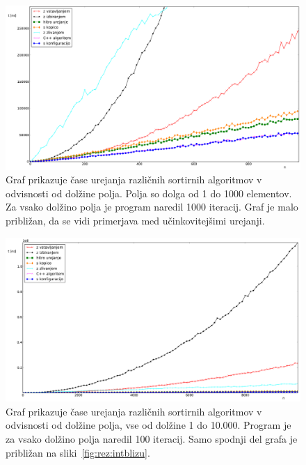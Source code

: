 \documentclass[a4paper,oneside,12pt]{article}
\begin{document}
\begin{figure}[h!]
    \includegraphics[width=\textwidth]{slike/int1000.pdf}
    \vspace{-0.7cm}
    \caption[Rezultati za tip \emph{int}, 1000 el.]{Graf prikazuje čase
    urejanja različnih sortirnih algoritmov v odvisnosti od dolžine polja. Polja
    so dolga od 1 do 1000 elementov. Za vsako dolžino polja je program naredil
    1000 iteracij. Graf je malo približan, da se vidi
    primerjava med učinkovitejšimi urejanji.}
    \label{fig:rez:int1000}
\end{figure}

\begin{figure}[h!]
    \includegraphics[width=\textwidth]{slike/int10000.pdf}
    \vspace{-0.7cm}
    \caption[Rezultati za tip  \emph{int}, 10.000 el.]{Graf prikazuje čase
    urejanja različnih sortirnih algoritmov v odvisnosti od dolžine polja, vse
    od dolžine 1 do 10.000. Program je za vsako dolžino polja naredil 100
    iteracij. Samo spodnji del grafa je približan na sliki~\ref{fig:rez:intblizu}.}
    \label{fig:rez:int}
\end{figure}
\end{document}
